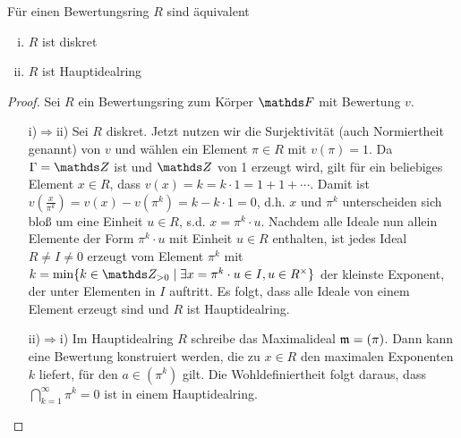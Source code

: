 \documentclass[ngerman,fontsize=11pt, paper=a4, parskip=half, titlepage=true, toc=bib]{scrartcl}
\begin{document}
\begin{Lem}\label{bewertungsringhir}
  Für einen Bewertungsring $R$ sind äquivalent
  \begin{enumerate}[i)]
  \item $R$ ist diskret
  \item $R$ ist Hauptidealring
  \end{enumerate}
  \begin{proof}
    Sei $R$ ein Bewertungsring zum Körper $\F$ mit Bewertung $v$.
    \begin{itemize}
    \item[i)$\Rightarrow$ii)] Sei $R$ diskret.
      Jetzt nutzen wir die Surjektivität (auch 
      Normiertheit genannt) von $v$ und wählen ein Element $\pi\in R$
      mit $v(\pi)=1$. Da $\Gamma=\Z$ ist und $\Z$ von 1 erzeugt wird,
      gilt für ein beliebiges Element $x\in R$, dass 
      $v(x)=k=k\cdot 1=1+1+\dotsb$. Damit ist 
      $v(\frac{x}{\pi^k})=v(x)-v(\pi^k)= k-k\cdot 1=0$, d.h. $x$ und 
      $\pi^k$ unterscheiden sich bloß um eine Einheit $u\in R$, s.d.
      $x=\pi^k \cdot u$.
      Nachdem alle Ideale nun allein Elemente der Form $\pi^k\cdot u$
      mit Einheit $u\in R$ enthalten, ist jedes Ideal $R\neq I\neq 0$ 
      erzeugt vom Element $\pi^k$ mit 
      $k=\min\{k\in\Z_{>0}\mid \exists x=\pi^k\cdot u\in I, u\in \Rx\}$
      der kleinste Exponent, der unter Elementen in $I$ auftritt.
      Es folgt, dass alle Ideale von einem Element erzeugt sind und
      $R$ ist Hauptidealring.
    \item[ii)$\Rightarrow$i)] Im Hauptidealring $R$ schreibe das 
      Maximalideal $\mathfrak{m}=(\pi)$. Dann kann eine Bewertung
      konstruiert werden, die zu $x\in R$ den maximalen Exponenten $k$ liefert, 
      für den $a\in (\pi^k)$ gilt.
      Die Wohldefiniertheit folgt daraus, dass
      $\bigcap_{k=1}^{\infty}\pi^k=0$ ist in einem Hauptidealring.
    \end{itemize}
  \end{proof}
\end{Lem}
\end{document}
